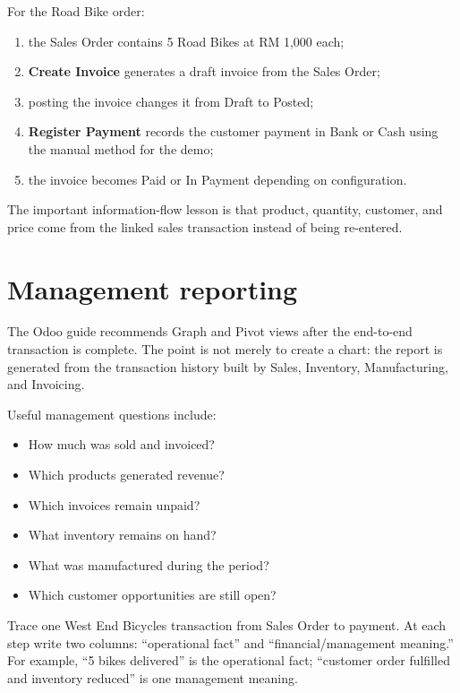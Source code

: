 \begin{odoobox}
For the Road Bike order:
\begin{enumerate}
  \item the Sales Order contains 5 Road Bikes at RM 1,000 each;
  \item \textbf{Create Invoice} generates a draft invoice from the Sales Order;
  \item posting the invoice changes it from Draft to Posted;
  \item \textbf{Register Payment} records the customer payment in Bank or Cash using the manual method for the demo;
  \item the invoice becomes Paid or In Payment depending on configuration.
\end{enumerate}
The important information-flow lesson is that product, quantity, customer, and price come from the linked sales transaction instead of being re-entered.
\end{odoobox}

\section{Management reporting}

The Odoo guide recommends Graph and Pivot views after the end-to-end transaction is complete. The point is not merely to create a chart: the report is generated from the transaction history built by Sales, Inventory, Manufacturing, and Invoicing.

Useful management questions include:

\begin{itemize}
  \item How much was sold and invoiced?
  \item Which products generated revenue?
  \item Which invoices remain unpaid?
  \item What inventory remains on hand?
  \item What was manufactured during the period?
  \item Which customer opportunities are still open?
\end{itemize}

\begin{tryit}
Trace one West End Bicycles transaction from Sales Order to payment. At each step write two columns: ``operational fact'' and ``financial/management meaning.'' For example, ``5 bikes delivered'' is the operational fact; ``customer order fulfilled and inventory reduced'' is one management meaning.
\end{tryit}

